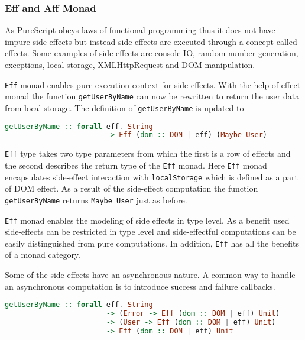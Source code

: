 \documentclass[article]{aaltoseries}
\begin{document}

    \subsubsection{Eff and Aff Monad}
      As PureScript obeys laws of functional programming thus it does not have
      impure side-effects but instead side-effects are executed through a concept
      called effects. Some examples of side-effects are console IO, random
      number generation, exceptions, local storage, XMLHttpRequest and DOM
      manipulation.

      \lstinline|Eff| monad enables pure execution context for side-effects.
      With the help of effect monad the function \lstinline|getUserByName| can now
      be rewritten to return the user data from local storage. The definition of
      \lstinline|getUserByName| is updated to

      \begin{lstlisting}[language=Haskell]
        getUserByName :: forall eff. String 
                        -> Eff (dom :: DOM | eff) (Maybe User)
      \end{lstlisting}
 
      \lstinline|Eff| type takes two type parameters from which the first is a
      row of effects and the second describes the return type of the
      \lstinline|Eff| monad. Here \lstinline|Eff| monad encapsulates side-effect
      interaction with \lstinline|localStorage| which is defined as a part of
      DOM effect. As a result of the side-effect computation the function
      \lstinline|getUserByName| returns \lstinline|Maybe User| just as before.
 
      \lstinline|Eff| monad enables the modeling of side effects in type level.
      As a benefit used side-effects can be restricted in type level and
      side-effectful computations can be easily distinguished from pure
      computations. In addition, \lstinline|Eff| has all the benefits of a monad
      category.
 
      Some of the side-effects have an asynchronous nature. A common way to handle
      an asynchronous computation is to introduce success and failure callbacks.
 
      \begin{lstlisting}[language=Haskell]
        getUserByName :: forall eff. String 
                        -> (Error -> Eff (dom :: DOM | eff) Unit) 
                        -> (User -> Eff (dom :: DOM | eff) Unit)
                        -> Eff (dom :: DOM | eff) Unit
      \end{lstlisting}
 
\end{document}
